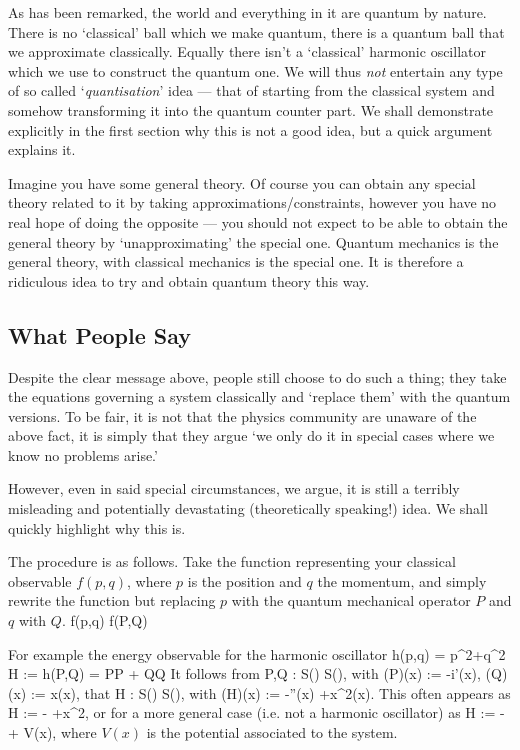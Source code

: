 As has been remarked, the world and everything in it are quantum by nature. There is no `classical' ball which we make quantum, there is a quantum ball that we approximate classically. Equally there isn't a `classical' harmonic oscillator which we use to construct the quantum one. We will thus \emph{not} entertain any type of so called `\emph{quantisation}' idea --- that of starting from the classical system and somehow transforming it into the quantum counter part. We shall demonstrate explicitly in the first section why this is not a good idea, but a quick argument explains it.

Imagine you have some general theory. Of course you can obtain any special theory related to it by taking approximations/constraints, however you have no real hope of doing the opposite --- you should not expect to be able to obtain the general theory by `unapproximating' the special one. Quantum mechanics is the general theory, with classical mechanics is the special one. It is therefore a ridiculous idea to try and obtain quantum theory this way.

\subsection{What People Say}

Despite the clear message above, people still choose to do such a thing; they take the equations governing a system classically and `replace them' with the quantum versions. To be fair, it is not that the physics community are unaware of the above fact, it is simply that they argue `we only do it in special cases where we know no problems arise.' 

However, even in said special circumstances, we argue, it is still a terribly misleading and potentially devastating (theoretically speaking!) idea. We shall quickly highlight why this is. 

The procedure is as follows. Take the function representing your classical observable $f(p,q)$, where $p$ is the position and $q$ the momentum, and simply rewrite the function but replacing $p$ with the quantum mechanical operator $P$ and $q$ with $Q$.
\bse 
f(p,q) \squiggle f(P,Q)
\ese 

For example the energy observable for the harmonic oscillator 
\bse 
h(p,q) = p^2+q^2 \squiggle H := h(P,Q) = P\circ P + Q\circ Q 
\ese 
It follows from 
\bse
P,Q : S(\R) \to S(\R),
\ese  
with 
\bse 
(P\psi)(x) := -i\hbar \psi'(x), \qquad  (Q\psi)(x) := x\psi(x),
\ese 
that 
\bse
H : S(\R) \to S(\R),
\ese  
with 
\bse 
(H\psi)(x) := -\psi''(x) +x^2\psi(x).
\ese 
This often appears as 
\bse 
H := - +x^2,
\ese 
or for a more general case (i.e. not a harmonic oscillator) as 
\bse 
H := - + V(x),
\ese 
where $V(x)$ is the potential associated to the system.

